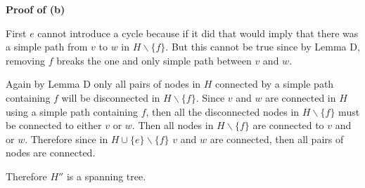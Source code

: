 \documentclass{article}
\begin{document}
\textbf{Proof of (b)} 

First $e$ cannot introduce a cycle because if it did that would imply that there was a simple path from $v$ to $w$ in $H \backslash \{f\}$. But this cannot be true since by Lemma D, removing $f$ breaks the one and only simple path between $v$ and $w$. 

Again by Lemma D only all pairs of nodes in $H$ connected by a simple path containing $f$ will be disconnected in $H \backslash \{f\}$. Since $v$ and $w$ are connected in $H$ using a simple path containing $f$, then all the disconnected nodes in $H \backslash \{f\}$ must be connected to either $v$ or $w$. Then all nodes in $H \backslash \{f\}$ are connected to $v$ and or $w$. Therefore since in $H \cup \{e\} \backslash \{f\}$ $v$ and $w$ are connected, then all pairs of nodes are connected. 

Therefore $H''$ is a spanning tree.


     


 
\end{document}
